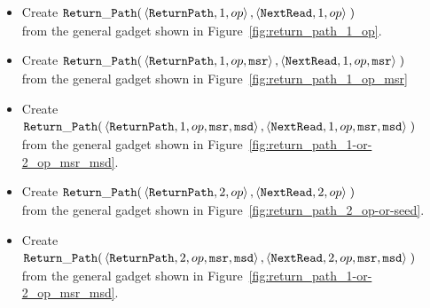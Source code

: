 \begin{itemize}

    \item Create
    $\begin{aligned}[t]
        {\tt Return\_Path}(& \left\langle {\tt ReturnPath}, 1, op \right\rangle,
                      \left\langle {\tt NextRead},   1, op \right\rangle \;)
    \end{aligned}$\\from the general gadget shown in Figure~\ref{fig:return_path_1_op}.

    \item Create
    $\begin{aligned}[t]
        {\tt Return\_Path}(& \left\langle {\tt ReturnPath}, 1, op, {\tt msr} \right\rangle,
                      \left\langle {\tt NextRead},   1, op, {\tt msr} \right\rangle \;)
    \end{aligned}$\\from the general gadget shown in Figure~\ref{fig:return_path_1_op_msr}

    \item Create
    $\begin{aligned}[t]
        {\tt Return\_Path}(& \left\langle {\tt ReturnPath}, 1, op, {\tt msr}, {\tt msd} \right\rangle,
                      \left\langle {\tt NextRead},   1, op, {\tt msr}, {\tt msd} \right\rangle \;)
    \end{aligned}$\\from the general gadget shown in Figure~\ref{fig:return_path_1-or-2_op_msr_msd}.


    \item Create
    $\begin{aligned}[t]
        {\tt Return\_Path}(& \left\langle {\tt ReturnPath}, 2, op \right\rangle,
                      \left\langle {\tt NextRead},   2, op \right\rangle \;)
    \end{aligned}$\\from the general gadget shown in Figure~\ref{fig:return_path_2_op-or-seed}.

    \item Create
    $\begin{aligned}[t]
        {\tt Return\_Path}(& \left\langle {\tt ReturnPath}, 2, op, {\tt msr}, {\tt msd} \right\rangle,
                      \left\langle {\tt NextRead},   2, op, {\tt msr}, {\tt msd} \right\rangle \;)
    \end{aligned}$\\from the general gadget shown in Figure~\ref{fig:return_path_1-or-2_op_msr_msd}.




\end{itemize}
